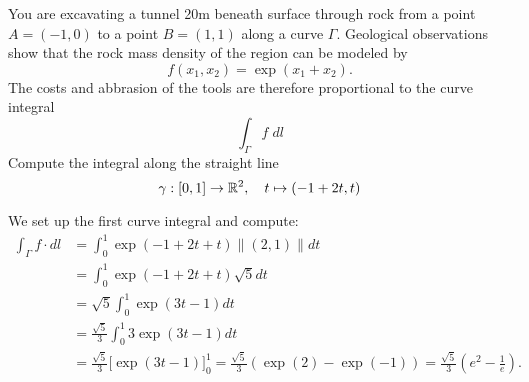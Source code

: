 \documentclass[11pt]{article}
\begin{document}
\begin{exercise}
    You are excavating a tunnel 20m beneath surface through rock from a point $A=(-1,0)$ to a point $B=(1,1)$ along a curve $\Gamma$.
    Geological observations show that the rock mass density of the region can be modeled by 
    \[
        f(x_1,x_2) = \exp(x_1+x_2).
    \]
    The costs and abbrasion of the tools are therefore proportional to the curve integral
    \[
        \int_\Gamma f \; dl
    \]
    Compute the integral along the straight line 
    \[
        \gamma : [0,1] \rightarrow \mathbb{R}^2, \quad t \mapsto (-1+2t, t)
    \]
\end{exercise}
\begin{solution}
    We set up the first curve integral and compute:
    \begin{align*}
        \int_\Gamma f \cdot dl
        &=
        \int_0^1 \exp(-1+2t+t) \|(2,1)\| dt
        \\&=
        \int_0^1 \exp(-1+2t+t) \sqrt{5} dt
        \\&=
        \sqrt{5} \int_0^1 \exp(3t-1) dt
        \\&=
        \frac{\sqrt{5}}{3} 
        \int_0^1 3 \exp(3t-1) dt
        \\&=
        \frac{\sqrt{5}}{3} 
        \Big[ \exp(3t-1) \Big]_0^1
        =
        \frac{\sqrt{5}}{3} 
        \left( \exp(2) - \exp(-1) \right)
        =
        \frac{\sqrt{5}}{3} 
        \left( e^2 - \frac{1}{e} \right)
        .
    \end{align*}
\end{solution}




\end{document}
